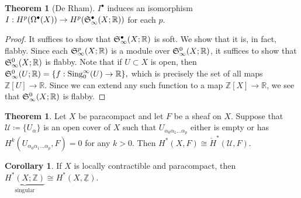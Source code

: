 \documentclass[10pt,letterpaper,cm]{nupset}
\theoremstyle{definition}
\theoremstyle{theorem}
\newtheorem{theorem}[definition]{Theorem}
\newtheorem{corollary}[definition]{Corollary}
\theoremstyle{remark}
\newcommand{\R}{\mathbb{R}}
\newcommand{\Z}{\mathbb Z}
\newcommand{\1}{\mathbb{1}}
\newcommand{\0}{\vec 0}
\DeclareMathOperator{\sing}{Sing}
\begin{document}
\begin{theorem}[De Rham]
$I^{\bullet}$ induces an isomorphism $I: H^{p}(\Omega^{\bullet}(X)) \to H^{p}(\frak{S}_{\infty}^{\bullet}(X; \R))$ for each $p$.
\end{theorem}
\begin{proof}
It suffices to show that $\frak{S}^{\bullet}_{\infty}(X; \R)$ is soft. We show that it is, in fact, flabby. Since each $\frak{S}^p_{\infty}(X; \R)$ is a module over $\frak{S}^0_{\infty}(X; \R)$, it suffices to show that $\frak{S}^0_{\infty}(X; \R)$ is flabby. Note that if $U \subset X$ is open, then  $\frak{S}^0_{\infty}(U; \R) = \{f : \sing_0^{\infty}(U) \to \R   \},$ which is precisely the set of all  maps $\Z[U] \to \R$. Since we can extend any such function to a map $\Z[X] \to \R$, we see that $\frak{S}^0_{\infty}(X; \R)$ is flabby. 
\end{proof}

\begin{theorem}
Let $X$ be paracompact and let $F$ be a sheaf on $X$. Suppose that $\mathcal{U} \coloneqq \{U_{\alpha}\}$ is an open cover of $X$ such that $U_{\alpha_0\alpha_1\ldots \alpha_p}$ either is empty or has $H^k(U_{\alpha_0\alpha_1\ldots \alpha_p}, F) =0$ for any $k>0$. Then $H^{\ast}(X, F) \cong \check{H}^{\ast}(\mathcal{U}, F)$.
\end{theorem}

\begin{corollary}
If $X$ is locally contractible and paracompact, then $\underbrace{H^{\ast}(X; \Z)}_{\text{singular}} \cong H^{\ast}(X, \underline{\Z})$.
\end{corollary}
\end{document}
